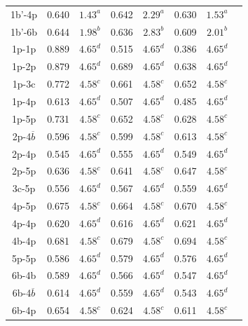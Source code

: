 \documentclass[preprint,12pt]{elsarticle}
\begin{document}
\begin{table}[h!]
\begin{tabular}{c|c|c|c|c|c|c|c}
       1b'-4p  & 0.640 &$1.43^{a}$ &0.642 & $2.29^{a}$&0.630 &$1.53^{a}$\\
       1b'-6b  &0.644  &$1.98^b$ &0.636 &$2.83^b$ &0.609 &$2.01^b$ \\
       1p-1p  &0.889  &$4.65^d$ &0.515 &$4.65^d$ &0.386 &$4.65^d$ \\
       1p-2p  &0.879  &$4.65^d$ &0.689 &$4.65^d$ &0.638 &$4.65^d$ \\
       1p-3c  &0.772  &$4.58^c$ &0.661 &$4.58^c$ &0.652 &$4.58^c$ \\
       1p-4p  &0.613  &$4.65^d$ &0.507 &$4.65^d$ &0.485 &$4.65^d$ \\
       1p-5p  &0.731  &$4.58^c$ &0.652 &$4.58^c$ &0.628 &$4.58^c$ \\
       2p-4$\overline{b}$  &0.596  &$4.58^c$ &0.599 &$4.58^c$ &0.613 & $4.58^c$\\
       2p-4p  &0.545 &$4.65^d$ &0.555 &$4.65^d$ &0.549 &$4.65^d$ \\
       2p-5p  &0.636  &$4.58^c$ &0.641 &$4.58^c$ &0.647 &$4.58^c$ \\
       3c-5p  &0.556  &$4.65^d$ &0.567 &$4.65^d$ &0.559 &$4.65^d$ \\
       4p-5p  &0.675  &$4.58^c$ &0.664 &$4.58^c$ &0.670 &$4.58^c$ \\
       4p-4p &0.620 &$4.65^d$ &0.616 &$4.65^d$ &0.621 &$4.65^d$ \\
       4b-4p  &0.681  &$4.58^c$ &0.679 &$4.58^c$ &0.694 &$4.58^c$ \\
       5p-5p &0.586 &$4.65^d$ &0.579 &$4.65^d$ &0.576 &$4.65^d$ \\
       6b-4b  &0.589  &$4.65^d$ &0.566 &$4.65^d$ &0.547 &$4.65^d$ \\
       6b-4$\overline{b}$  &0.614  &$4.65^d$ &0.559 &$4.65^d$ &0.543 &$4.65^d$ \\
       6b-4p  &0.654  &$4.58^c$ &0.624 &$4.58^c$ &0.611 &$4.58^c$ \\
       \bottomrule
    \end{tabular}
    \label{tab:jumps_vac_oversized}
\end{table}
\end{document}
